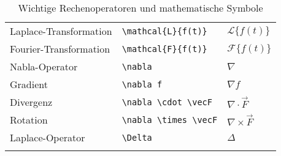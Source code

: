 \begin{longtable}{l l l}
    \midrule
    Laplace-Transformation    & \texttt{\textbackslash mathcal\{L\}\{f(t)\}}                                            & \( \mathcal{L}\{f(t)\} \)            \\
    Fourier-Transformation    & \texttt{\textbackslash mathcal\{F\}\{f(t)\}}                                            & \( \mathcal{F}\{f(t)\} \)            \\
    Nabla-Operator            & \texttt{\textbackslash nabla}                                                           & \( \nabla \)                         \\
    Gradient                  & \texttt{\textbackslash nabla f}                                                         & \( \nabla f \)                       \\
    Divergenz                 & \texttt{\textbackslash nabla \textbackslash cdot \textbackslash vec{F}}                 & \( \nabla \cdot \vec{F} \)           \\
    Rotation                  & \texttt{\textbackslash nabla \textbackslash times \textbackslash vec{F}}                & \( \nabla \times \vec{F} \)          \\
    Laplace-Operator          & \texttt{\textbackslash Delta}                                                           & \( \Delta \)                         \\
    \caption{Wichtige Rechenoperatoren und mathematische Symbole} \label{tab:operatoren}
\end{longtable}
